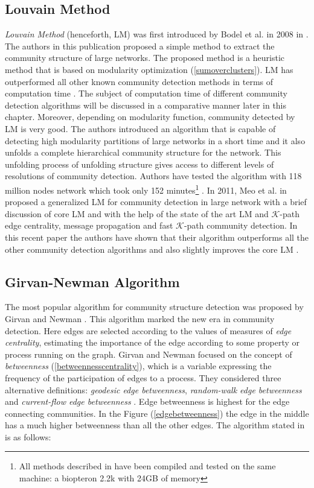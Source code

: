 \subsection{Louvain Method}\label{subsec:louvain_method}
\textit{Louvain Method} (henceforth, LM) was first introduced by Bodel et al. in 2008 in \cite{ref-27}. The authors in this publication proposed a simple method to extract the community structure of large networks. The proposed method is a heuristic method that is based on modularity optimization (\ref{sumoverclusters}). LM has outperformed all other known community detection methods in terms of computation time \cite{ref-28}. The subject of computation time of different community detection algorithms will be discussed in a comparative manner later in this chapter. Moreover, depending on modularity function, community detected by LM is very good. The authors introduced an algorithm that is capable of detecting high modularity partitions of large networks in a short time and it also unfolds a complete hierarchical community structure for the network. This unfolding process of unfolding structure gives access to different levels of resolutions of community detection. Authors have tested the algorithm with 118 million nodes network which took only 152 minutes\footnote{All methods described in \cite{ref-27} have been compiled and tested on the same machine: a biopteron
2.2k with 24GB of memory} \cite{ref-27}. In 2011, Meo et al. in \cite{ref-28} proposed a generalized LM for community detection in large network with a brief discussion of core LM \cite{ref-27} and with the help of the state of the art LM and $\mathcal{K}$-path edge centrality, message propagation and fast $\mathcal{K}$-path community detection. In this recent paper the authors have shown that their algorithm outperforms all the other community detection algorithms and also slightly improves the core LM \cite{ref-28}.

\subsection{Girvan-Newman Algorithm}\label{girvan-newman}
The most popular algorithm for community structure detection was proposed by Girvan and Newman \cite{ref-1}. This algorithm marked the new era in community detection. Here edges are selected according to the values of measures of \textit{edge centrality}, estimating the importance of the edge according to some property or process running on the graph. Girvan and Newman focused on the concept of \textit{betweenness} (\ref{betweennesscentrality}), which is a variable expressing the frequency of the participation of edges to a process. They considered three alternative definitions: \textit{geodesic edge betweenness}, \textit{random-walk edge betweenness} and \textit{current-flow edge betweenness} \cite{ref-6}. Edge betweenness is highest for the edge connecting communities. In the Figure (\ref{edgebetweenness}) the edge in the middle has a much higher betweenness than all the other edges. The algorithm stated in \cite{ref-1} is as follows:

